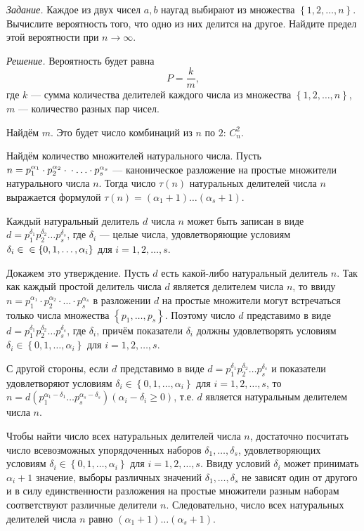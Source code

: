\documentclass{book}
\begin{document}
\textit{Задание.} Каждое из двух чисел $a, b$ наугад выбирают из множества $ \left\{ 1, 2, \dotsc, n \right\}$.
Вычислите вероятность того, что одно из них делится на другое.
Найдите предел этой вероятности при $n \rightarrow \infty$.

\textit{Решение.} Вероятность будет равна
$$P =
\frac{k}{m},$$
где $k$ --- сумма количества делителей каждого числа из множества  $ \left\{ 1, 2, \dotsc, n \right\}$, $m$ --- количество разных пар чисел.

Найдём $m$.
Это будет число комбинаций из $n$ по $2$: $C_n^2$.

Найдём количество множителей натурального числа.
Пусть
$n =
p_1^{ \alpha_1} \cdot p_2^{ \alpha_2} \cdot \\
\cdot \dotsc \cdot p_s^{ \alpha_s}$
--- каноническое разложение на простые множители натурального числа $n$.
Тогда число $ \tau \left( n \right) $ натуральных делителей числа $n$ выражается формулой
$ \tau \left( n \right) =
\left( \alpha_1 + 1 \right) \dotsc \left( \alpha_s + 1 \right)$.

Каждый натуральный делитель $d$ числа $n$
может быть записан в виде
$d = p_1^{ \delta_1} p_2^{ \delta_2} \dotsc p_s^{ \delta_s}$, где $ \delta_i$ ---
целые числа, удовлетворяющие условиям
$ \delta_i \in  \\
\in \left\{ 0, 1, \dotsc, \alpha_i \right\}$
для $i = 1, 2, \dotsc, s$.

Докажем это утверждение.
Пусть $d$ есть какой-либо натуральный делитель $n$.
Так как каждый простой делитель числа $d$
является делителем числа $n$, то ввиду
$n =
p_1^{ \alpha_1} \cdot p_2^{ \alpha_2} \cdot \dotsc \cdot p_s^{ \alpha_s}$
в разложении $d$ на простые множители могут встречаться только числа множества $ \left\{ p_1, \dotsc, p_s \right\}$.
Поэтому число $d$ представимо в виде $d = p_1^{ \delta_1} p_2^{ \delta_2} \dotsc p_s^{ \delta_s}$, где $ \delta_i$,
причём показатели $ \delta_i$ должны удовлетворять условиям
$ \delta_i \in \left\{ 0, 1, \dotsc, \alpha_i \right\}$ для $i = 1, 2, \dotsc, s$.

С другой стороны, если $d$ представимо в виде
$d =
p_1^{ \delta_1} p_2^{ \delta_2} \dotsc p_s^{ \delta_s}$
и показатели удовлетворяют условиям
$ \delta_i \in \left\{ 0, 1, \dotsc, \alpha_i \right\}$
для $i = 1, 2, \dotsc, s$, то
$n =
d \left( p_1^{ \alpha_1 - \delta_1} \dotsc p_s^{ \alpha_s - \delta_s} \right) \left( \alpha_i - \delta_i \geq 0 \right)$,
т.е. $d$ является натуральным делителем числа $n$.

Чтобы найти число всех натуральных делителей числа $n$,
достаточно посчитать число всевозможных упорядоченных наборов
$ \delta_1, \dotsc, \delta_s$, удовлетворяющих условиям
$ \delta_i \in \left\{ 0, 1, \dotsc, \alpha_i \right\}$ для $i = 1, 2, \dotsc, s$.
Ввиду условий $ \delta_i$ может принимать $ \alpha_i + 1$ значение,
выборы различных значений $ \delta_1, \dotsc, \delta_s$
не зависят один от другого
и в силу единственности разложения на простые множители разным наборам соответствуют различные делители $n$.
Следовательно, число всех натуральных делителей числа $n$ равно
$ \left( \alpha_1 + 1 \right) \dotsc \left( \alpha_s + 1 \right)$.
\end{document}

